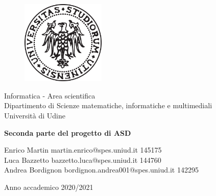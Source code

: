 \documentclass[a4paper,11pt]{report}
\begin{document}
    \begin{titlepage}

        \clearpage\thispagestyle{empty}
        \centering
        \begin{figure}[h!]
            \begin{center}
                \includegraphics[width=4cm]{img/logo1}\\
            \end{center}
        \end{figure}
        {\normalsize Informatica - Area scientifica \\  Dipartimento di Scienze matematiche, informatiche e multimediali\\  Università di Udine \par}
        \vspace{3cm}
        {\Huge \textbf{Seconda parte del progetto di ASD}\\
        \vspace{4cm}
            \begin{center}
                \Large
                Enrico Martin martin.enrico@spes.uniud.it 145175 \\
                Luca Bazzetto bazzetto.luca@spes.uniud.it 144760 \\
                Andrea Bordignon bordignon.andrea001@spes.uniud.it 142295
            \end{center}

            \vspace{9cm}
            {\normalsize Anno accademico 2020/2021}
            \pagebreak
        }
    \end{titlepage}

    \tableofcontents{}
    \pagebreak
\end{document}
